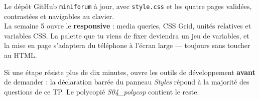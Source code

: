 \documentclass[a4paper,11pt]{article}
\begin{document}
\vspace{6pt}
\begin{tcolorbox}[attention, title={À rendre avant la semaine 5}]
Le dépôt GitHub \texttt{miniforum} à jour, avec \texttt{style.css} et les quatre pages validées, contrastées et navigables au clavier.\\[4pt]
La semaine 5 ouvre le \textbf{responsive} : media queries, CSS Grid, unités relatives et variables CSS. La palette que tu viens de fixer deviendra un jeu de variables, et la mise en page s'adaptera du téléphone à l'écran large --- toujours sans toucher au HTML.
\end{tcolorbox}

\vspace{6pt}
\begin{tcolorbox}[astuce, title={Bloqué ?}]
Si une étape résiste plus de dix minutes, ouvre les outils de développement \textbf{avant} de demander : la déclaration barrée du panneau \textit{Styles} répond à la majorité des questions de ce TP. Le polycopié \textit{S04\_polycop} contient le reste.
\end{tcolorbox}
\end{document}
